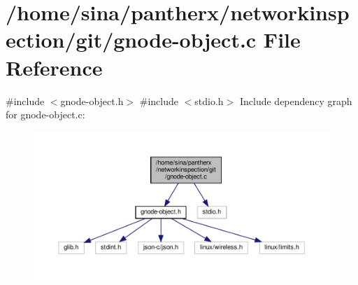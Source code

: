 \hypertarget{gnode-object_8c}{}\section{/home/sina/pantherx/networkinspection/git/gnode-\/object.c File Reference}
\label{gnode-object_8c}
{\ttfamily \#include $<$gnode-\/object.\+h$>$}\newline
{\ttfamily \#include $<$stdio.\+h$>$}\newline
Include dependency graph for gnode-\/object.c\+:\nopagebreak
\begin{figure}[H]
\begin{center}
\leavevmode
\includegraphics[width=350pt]{gnode-object_8c__incl}
\end{center}
\end{figure}
